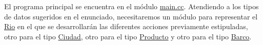 El programa principal se encuentra en el módulo \mbox{\hyperlink{main_8cc}{main.\+cc}}. Atendiendo a los tipos de datos sugeridos en el enunciado, necesitaremos un módulo para representar el \mbox{\hyperlink{classRio}{Rio}} en el que se desarrollarán las diferentes acciones previamente estipuladas, otro para el tipo \mbox{\hyperlink{classCiudad}{Ciudad}}, otro para el tipo \mbox{\hyperlink{classProducto}{Producto}} y otro para el tipo \mbox{\hyperlink{classBarco}{Barco}}. 